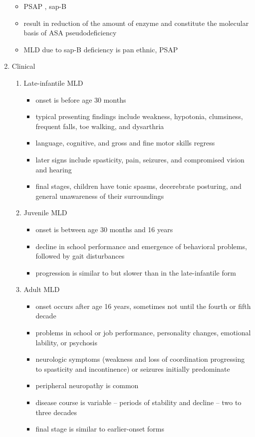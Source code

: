 \documentclass{scrartcl}
\begin{document}
\begin{enumerate}
\begin{itemize}
\item PSAP , sap-B
\item result in reduction of the amount of enzyme and constitute the molecular basis of ASA pseudodeficiency
\item MLD due to sap-B deficiency is pan ethnic, PSAP
\end{itemize}

\item Clinical
\label{sec:org3cf7648}
\begin{enumerate}
\item Late-infantile MLD
\label{sec:org46de541}
\begin{itemize}
\item onset is before age 30 months
\item typical presenting findings include weakness, hypotonia, clumsiness, frequent falls, toe walking, and dysarthria
\item language, cognitive, and gross and fine motor skills regress
\item later signs include spasticity, pain, seizures, and compromised vision and hearing
\item final stages, children have tonic spasms, decerebrate posturing, and
general unawareness of their surroundings
\end{itemize}

\item Juvenile MLD
\label{sec:orgdaa263b}
\begin{itemize}
\item onset is between age 30 months and 16 years
\item decline in school performance and emergence of behavioral problems, followed by gait disturbances
\item progression is similar to but slower than in the late-infantile form
\end{itemize}

\item Adult MLD
\label{sec:org8b8969f}
\begin{itemize}
\item onset occurs after age 16 years, sometimes not until the fourth or fifth decade
\item problems in school or job performance, personality changes, emotional lability, or psychosis
\item neurologic symptoms (weakness and loss of coordination progressing
to spasticity and incontinence) or seizures initially
predominate
\item peripheral neuropathy is common
\item disease course is variable – periods of stability and decline – two to three decades
\item final stage is similar to earlier-onset forms
\end{itemize}
\end{enumerate}


\end{enumerate}
\end{document}
